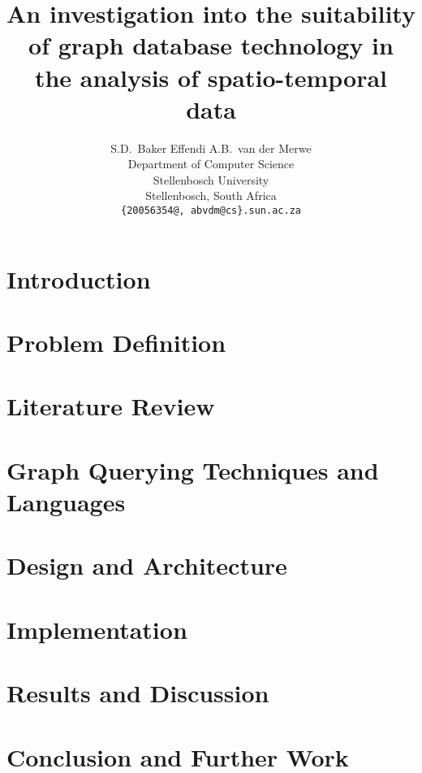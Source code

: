 \documentclass{article}
\title{An investigation into the suitability of graph database technology in the analysis of spatio-temporal data}
\author{
  S.D.~Baker Effendi \qquad  A.B.~van der Merwe \\
  Department of Computer Science\\
  Stellenbosch University\\
  Stellenbosch, South Africa \\
  \texttt{\{20056354@, abvdm@cs\}.sun.ac.za} \\
}
\begin{document}
\maketitle



\twocolumn

\section{Introduction}

\FloatBarrier

\section{Problem Definition}
\label{sec:prob-def}

\FloatBarrier

\section{Literature Review}
\label{sec:lit-rev}

\FloatBarrier

\section{Graph Querying Techniques and Languages}
\label{sec:graph-lang}

\FloatBarrier

\section{Design and Architecture}
\label{sec:des-arch}

\FloatBarrier

\section{Implementation}
\label{sec:impl}


\section{Results and Discussion}
\label{sec:experiments}

\FloatBarrier

\section{Conclusion and Further Work}
\label{sec:conclusion}

\FloatBarrier

\newpage



\end{document}

